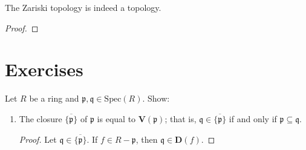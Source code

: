 \begin{prps}
    The Zariski topology is indeed a topology.
\end{prps}
\begin{proof}
    
\end{proof}

\section{Exercises}
\begin{exr}
    Let \(R\) be a ring and \(\mathfrak{p}, \mathfrak{q} \in \mathrm{Spec}(R)\). Show:
    \begin{enumerate}
        \item The closure \(\overline{\{\mathfrak{p}\}}\) of \(\mathfrak{p}\) is equal to \(\mathbf{V}(\mathfrak{p})\); that is, \(\mathfrak{q} \in \overline{\{\mathfrak{p}\}}\) if and only if \(\mathfrak{p} \subseteq \mathfrak{q}\).
        \begin{proof}
            Let \(\mathfrak{q} \in \overline{\{\mathfrak{p}\}}\). If \(f \in R - \mathfrak{p}\), then \(\mathfrak{q} \in \mathbf{D}(f)\).
        \end{proof}
    \end{enumerate}
\end{exr}

